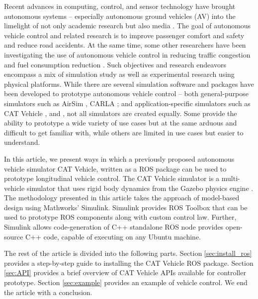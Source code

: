 \documentclass[
]{article}
\begin{document}
Recent advances in computing, control, and sensor technology have
brought autonomous systems -- especially autonomous ground vehicles (AV)
into the limelight of not only academic research but also media
\cite{zhu2020modelling}. The goal of autonomous vehicle control and
related research is to improve passenger comfort and safety
\cite{du2018velocity,mohajer2020enhancing} and reduce road
accidents\cite{michalowska2017autonomous}. At the same time, some
other researchers have been investigating the use of autonomous vehicle
control in reducing traffic congestion
\cite{delle2019feedback,stern2018dissipation,bhadani2019real,bhadani2018dissipation}
and fuel consumption reduction
\cite{lichtle2021fuel,qin2018stability}. Such objectives and
research endeavors encompass a mix of simulation study as well as
experimental research using physical platforms. While there are several
simulation software and packages have been developed to prototype
autonomous vehicle control -- both general-purpose simulators such as
AirSim \cite{shah2018airsim}, CARLA \cite{dosovitskiy2017carla};
and application-specific simulators such as CAT Vehicle
\cite{bhadani2018cat}, and \cite{wu2017flow}, not all simulators
are created equally. Some provide the ability to prototype a wide
variety of use cases but at the same arduous and difficult to get
familiar with, while others are limited in use cases but easier to
understand.

In this article, we present ways in which a previously proposed
autonomous vehicle simulator CAT Vehicle, written as a ROS package
\cite{quigley2009ros} can be used to prototype longitudinal vehicle
control. The CAT Vehicle simulator is a multi-vehicle simulator that
uses rigid body dynamics from the Gazebo physics engine
\cite{koenig2004design}. The methodology presented in this article
takes the approach of model-based design using Mathworks' Simulink.
Simulink provides ROS Toolbox that can be used to prototype ROS
components along with custom control law. Further, Simulink allows
code-generation of C++ standalone ROS node provides open-source C++
code, capable of executing on any Ubuntu machine.

The rest of the article is divided into the following parts. Section
\ref{sec:install_ros} provides a step-by-step guide to installing the
CAT Vehicle ROS package. Section \ref{sec:API} provides a brief overview
of CAT Vehicle APIs available for controller prototype. Section
\ref{sec:example} provides an example of vehicle control. We end the
article with a conclusion.
\end{document}

